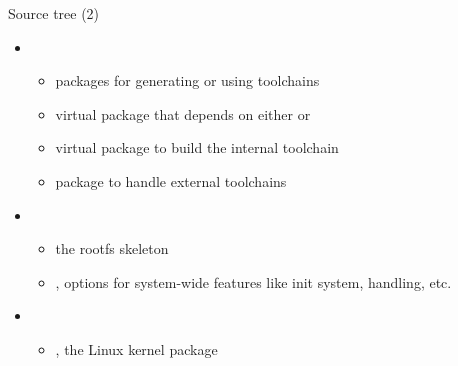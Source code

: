\begin{frame}{Source tree (2)}
  \begin{itemize}
  \item {}
    \begin{itemize}
    \item packages for generating or using toolchains
    \item {} virtual package that depends on either
       or 
    \item {} virtual package to build the
      internal toolchain
    \item {} package to handle external
      toolchains
    \end{itemize}
  \item {}
    \begin{itemize}
    \item {} the rootfs skeleton
    \item {}, options for system-wide features like
      init system,  handling, etc.
    \end{itemize}
  \item {}
    \begin{itemize}
    \item {}, the Linux kernel package
    \end{itemize}
  \end{itemize}
\end{frame}

